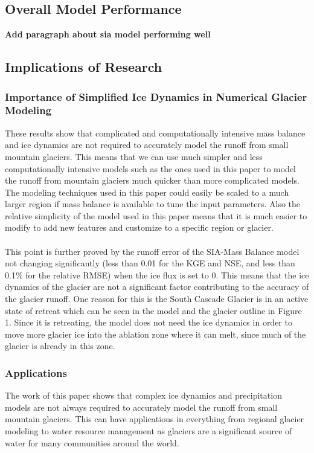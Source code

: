 \documentclass{article}
\begin{document}
\subsection{Overall Model Performance}\textbf{Add paragraph about sia model performing well}
\subsection{Implications of Research}
\subsubsection{Importance of Simplified Ice Dynamics in Numerical Glacier Modeling}
These results show that complicated and computationally intensive mass balance and ice dynamics are not required to accurately model the 
runoff from small mountain glaciers. This means that we can use much simpler and less computationally intensive models such as the ones used 
in this paper to model the runoff from mountain glaciers much quicker than more complicated models. The modeling techniques used in this paper could 
easily be scaled to a much larger region if mass balance is available to tune the input parameters. Also the relative simplicity of the model used in 
this paper means that it is much easier to modify to add new features and customize to a specific region or glacier.
\paragraph{}
This point is further proved by the runoff error of the SIA-Mass Balance model not changing significantly (less than 0.01 for the KGE and NSE, and less than 
0.1\% for the relative RMSE) when 
the ice flux is set to 0. This means that the ice dynamics of the glacier are not a significant factor contributing to the accuracy of the glacier runoff. One reason 
for this is the South Cascade Glacier is in an active state of retreat which can be seen in the model and the 
glacier outline in Figure 1. Since it is retreating, the model does not need the ice dynamics in order to move more glacier ice into the ablation zone 
where it can melt, since much of the glacier is already in this zone.
\subsubsection{Applications}
The work of this paper shows that complex ice dynamics and precipitation models are not always required to accurately model the runoff from small mountain glaciers. This 
can have applications in everything from regional glacier modeling to water resource management as glaciers are a significant source of water 
for many communities around the world. 
\end{document}
